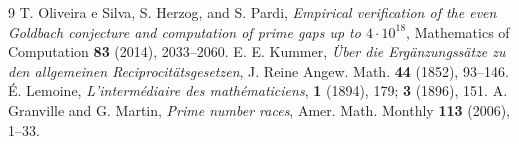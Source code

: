 \documentclass[11pt,a4paper]{article}
\begin{document}
\begin{thebibliography}{9}
 T. Oliveira e Silva, S. Herzog, and S. Pardi, \emph{Empirical verification of the even Goldbach conjecture and computation of prime gaps up to $4 \cdot 10^{18}$}, Mathematics of Computation \textbf{83} (2014), 2033--2060.
 E. E. Kummer, \emph{\"Uber die Erg\"anzungss\"atze zu den allgemeinen Reciprocit\"atsgesetzen}, J. Reine Angew. Math. \textbf{44} (1852), 93--146.
 \'E. Lemoine, \emph{L'interm\'ediaire des math\'ematiciens}, \textbf{1} (1894), 179; \textbf{3} (1896), 151.
 A. Granville and G. Martin, \emph{Prime number races}, Amer. Math. Monthly \textbf{113} (2006), 1--33.
\end{thebibliography}
\end{document}
